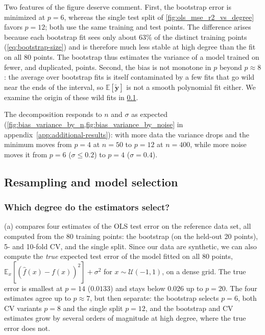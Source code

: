 Two features of the figure deserve comment. First, the bootstrap error is
minimized at $p=6$, whereas the single test split of
\cref{fig:ols_mse_r2_vs_degree} favors $p = 12$; both use the same training and
test points. The difference arises because each bootstrap fit sees only about
$63\%$ of the distinct training points (\cref{eq:bootstrap-size}) and is
therefore much less stable at high degree than the fit on all 80 points. The
bootstrap thus estimates the variance of a model trained on fewer, and
duplicated, points. Second, the bias is not monotone in $p$ beyond $p\approx8$:
the average over bootstrap fits is itself contaminated by a few fits that go
wild near the ends of the interval, so $\mathbb{E}[\tilde{\bm y}]$ is not a
smooth polynomial fit either. We examine the origin of these wild fits in
\cref{subsec:results-selection}.

The decomposition responds to $n$ and $\sigma$ as expected
(\cref{fig:bias_variance_by_n,fig:bias_variance_by_noise} in
appendix~\ref{app:additional-results}): with more data the variance drops and
the minimum moves from $p = 4$ at $n=50$ to $p=12$ at $n=400$, while more noise
moves it from $p=6$ ($\sigma \leq 0.2$) to $p=4$ ($\sigma = 0.4$).

\subsection{Resampling and model selection}
\label{subsec:results-selection}

\subsubsection{Which degree do the estimators select?}
(a) compares four estimates of the OLS test error on
the reference data set, all computed from the 80 training points: the bootstrap
(on the held-out 20 points), 5- and 10-fold CV, and the single split. Since our
data are synthetic, we can also compute the \emph{true} expected test error of
the model fitted on all 80 points, $\mathbb{E}_x[(\hat f(x)-f(x))^2] + \sigma^2$
for $x\sim\mathcal{U}(-1,1)$, on a dense grid. The true error is smallest at
$p=14$ ($0.0133$) and stays below $0.026$ up to $p=20$. The four estimates agree
up to $p\approx7$, but then separate: the bootstrap selects $p=6$, both CV
variants $p = 8$ and the single split $p=12$, and the bootstrap and CV
estimates grow by several orders of magnitude at high degree, where the true
error does not.

